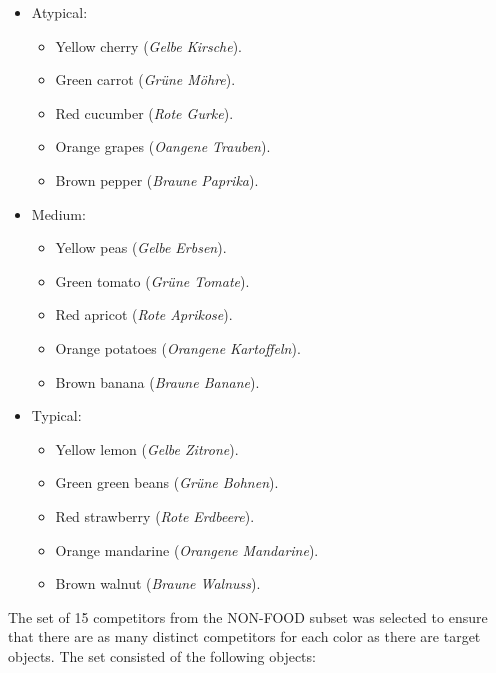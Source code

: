 \documentclass[
  12pt,
]{article}
\providecommand{\tightlist}{%
  \setlength{\itemsep}{0pt}\setlength{\parskip}{0pt}}
\begin{document}
\begin{itemize}
\tightlist
\item
  Atypical:

  \begin{itemize}
  \tightlist
  \item
    Yellow cherry (\emph{Gelbe Kirsche}).
  \item
    Green carrot (\emph{Grüne Möhre}).
  \item
    Red cucumber (\emph{Rote Gurke}).
  \item
    Orange grapes (\emph{Oangene Trauben}).
  \item
    Brown pepper (\emph{Braune Paprika}).
  \end{itemize}
\item
  Medium:

  \begin{itemize}
  \tightlist
  \item
    Yellow peas (\emph{Gelbe Erbsen}).
  \item
    Green tomato (\emph{Grüne Tomate}).
  \item
    Red apricot (\emph{Rote Aprikose}).
  \item
    Orange potatoes (\emph{Orangene Kartoffeln}).
  \item
    Brown banana (\emph{Braune Banane}).
  \end{itemize}
\item
  Typical:

  \begin{itemize}
  \tightlist
  \item
    Yellow lemon (\emph{Gelbe Zitrone}).
  \item
    Green green beans (\emph{Grüne Bohnen}).
  \item
    Red strawberry (\emph{Rote Erdbeere}).
  \item
    Orange mandarine (\emph{Orangene Mandarine}).
  \item
    Brown walnut (\emph{Braune Walnuss}).
  \end{itemize}
\end{itemize}

The set of 15 competitors from the NON-FOOD subset was selected to ensure that there are as many distinct competitors for each color as there are target objects.
The set consisted of the following objects:
\end{document}
